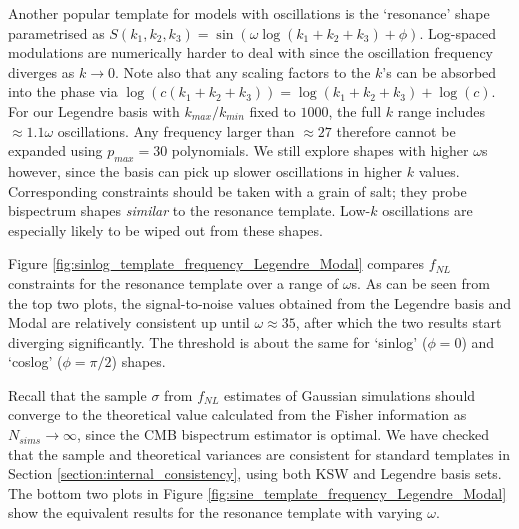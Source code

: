 Another popular template for models with oscillations is the `resonance' shape parametrised as $S(k_1, k_2, k_3) = \sin(\omega \log(k_1 + k_2 + k_3 ) + \phi)$. Log-spaced modulations are numerically harder to deal with since the oscillation frequency diverges as $k \rightarrow 0$. Note also that any scaling factors to the $k$'s can be absorbed into the phase via $\log(c(k_1 + k_2 + k_3)) = \log(k_1 + k_2 + k_3) + \log(c)$. For our Legendre basis with $k_{max}/k_{min}$ fixed to $1000$, the full $k$ range includes $\approx 1.1\omega$ oscillations. Any frequency larger than $\approx 27$ therefore cannot be expanded using $p_{max}=30$ polynomials. We still explore shapes with higher $\omega$s however, since the basis can pick up slower oscillations in higher $k$ values. Corresponding constraints should be taken with a grain of salt; they probe bispectrum shapes \textit{similar} to the resonance template. Low-$k$ oscillations are especially likely to be wiped out from these shapes.

Figure \ref{fig:sinlog_template_frequency_Legendre_Modal} compares $f_{NL}$ constraints for the resonance template over a range of $\omega$s. As can be seen from the top two plots, the signal-to-noise values obtained from the Legendre basis and Modal are relatively consistent up until $\omega \approx 35$, after which the two results start diverging significantly. The threshold is about the same for `sinlog' ($\phi = 0$) and `coslog' ($\phi=\pi/2$) shapes.

Recall that the sample $\sigma$ from $f_{NL}$ estimates of Gaussian simulations should converge to the theoretical value calculated from the Fisher information as $N_{sims}\rightarrow\infty$, since the CMB bispectrum estimator is optimal. We have checked that the sample and theoretical variances are consistent for standard templates in Section \ref{section:internal_consistency}, using both KSW and Legendre basis sets. The bottom two plots in Figure \ref{fig:sine_template_frequency_Legendre_Modal} show the equivalent results for the resonance template with varying $\omega$.

